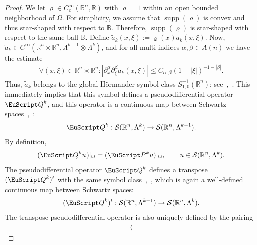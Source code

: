 \documentclass[10pt,a4paper]{amsart}
\theoremstyle{definition}
\theoremstyle{remark}
\numberwithin{equation}{section}
\newcommand{\bbB}{{\mathbb B}}
\newcommand{\bbR}{{\mathbb R}}
\newcommand{\calS}{{\mathcal S}}
\newcommand{\euP}{{\EuScript P}}
\newcommand{\euQ}{{\EuScript Q}}
\newcommand{\closure}{\overline}
\renewcommand{\restriction}{|}
\newcommand{\smallball}{\bbB}
\newcommand{\supp}{\operatorname{supp}}
\newcommand{\vecnorm}[1]{|#1|}
\newcommand{\Domain}{{\Omega}}
\newcommand{\Alt}[1]{\Lambda^{#1}}
\newcommand{\Poincare}{\euP}
\begin{document}
\begin{proof}
    We let $\varrho \in C^{\infty}_{c}(\bbR^{n},\bbR)$ with $\varrho = 1$ within an open bounded neighborhood of $\closure\Domain$.
    For simplicity, we assume that $\supp(\varrho)$ is convex and thus star-shaped with respect to $\smallball$. 
    Therefore, $\supp(\varrho)$ is star-shaped with respect to the same ball $\smallball$. 
    Define $\widetilde{a}_{k}(x,\xi) := \varrho(x) a_{k}(x,\xi)$. 
    Now, $\widetilde{a}_{k} \in C^{\infty}( \bbR^{n} \times \bbR^{n}, \Alt{k-1} \otimes \Alt{k} )$,
    and for all multi-indices $\alpha, \beta \in A(n)$ we have the estimate 
    \begin{align*}
        \forall
        (x,\xi) \in \bbR^{n} \times \bbR^{n}
        :
        \vecnorm{ \partial_{x}^{\alpha} \partial_{\xi}^{\beta} \widetilde{a}_{k}( x, \xi ) }
        \leq 
        C_{\alpha,\beta} 
        \left( 1 + \lvert \xi \rvert \right)^{ - 1 - |\beta| }
        .
    \end{align*}
    Thus, $\widetilde{a}_{k}$ belongs to the global H\"ormander symbol class $S^{-1}_{1,0}(\bbR^{n})$;
    see~\cite[Definition 18.1.1]{hoermander},~\cite[Definition 6.1]{wong}.
    This immediately implies that this symbol defines a pseudodifferential operator ${\euQ}^{k}$,
    and this operator is a continuous map between Schwartz spaces~\cite[Theorem~18.1.6]{hoermander},~\cite[Proposition~6.7]{wong}:
    \begin{align}\label{math:improved-operator:schwartz}
        {\euQ}^{k} : \calS(\bbR^{n},\Alt{k}) \to \calS(\bbR^{n},\Alt{k-1})
        .
    \end{align}
    By definition, 
    \begin{align}\label{math:improved-operator-coincides-with-original}
        ( {\euQ}^{k} u ) \restriction_{\Domain} = ( \Poincare^{k} u ) \restriction_{\Domain}, \qquad u \in \calS(\bbR^{n},\Alt{k}).
    \end{align}
    The pseudodifferential operator ${\euQ}^{k}$ defines a transpose $({\euQ}^{k})^{t}$ with the same symbol class~\cite[Theorem~18.1.7]{hoermander},~\cite[Theorem I.3.1]{treves1},
    which is again a well-defined continuous map between Schwartz spaces:
    \begin{align}\label{math:improved-operator-transpose:schwartz}
        ({\euQ}^{k})^{t} : \calS(\bbR^{n},\Alt{k-1}) \to \calS(\bbR^{n},\Alt{k})
        .
    \end{align}
    The transpose pseudodifferential operator is also uniquely defined by the pairing 
    \begin{align*}
        \left\langle 

\end{align*}
\end{proof}
\end{document}
